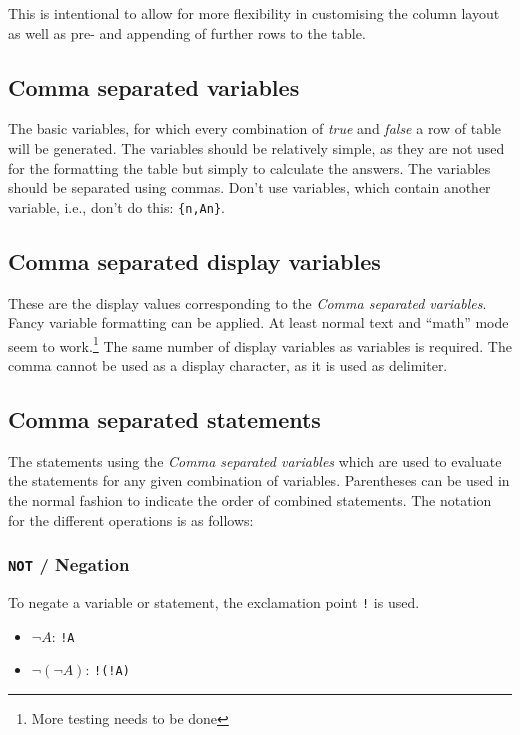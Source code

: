 \documentclass[a4paper]{article}
\begin{document}
This is intentional to allow for more flexibility in customising the column layout as well as pre- and appending of further rows to the table.

\subsection{Comma separated variables}

The basic variables, for which every combination of \emph{true} and \emph{false} a row of table will be generated. The variables should be relatively simple, as they are not used for the formatting the table but simply to calculate the answers. The variables should be separated using commas. Don't use variables, which contain another variable, i.e., don't do this: \texttt{\{n,An\}}.

\subsection{Comma separated display variables}

These are the display values corresponding to the \emph{Comma separated variables}. Fancy variable formatting can be applied. At least normal text and ``math'' mode seem to work.\footnote{More testing needs to be done}
The same number of display variables as variables is required. The comma cannot be used as a display character, as it is used as delimiter.

\subsection{Comma separated statements}

The statements using the \emph{Comma separated variables} which are used to evaluate the statements for any given combination of variables. Parentheses can be used in the normal fashion to indicate the order of combined statements. The notation for the different operations is as follows:

\subsubsection{\texttt{NOT} / Negation}

To negate a variable or statement, the exclamation point \texttt{!} is used.
\begin{itemize}
	\item $\lnot A$:  \texttt{!A}
	\item $\lnot (\lnot A)$: \texttt{!(!A)}
\end{itemize}
\end{document}
